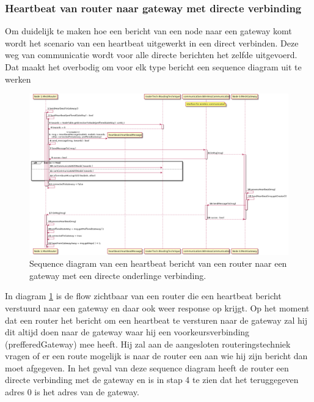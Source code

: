 \documentclass[a4paper, 11pt, oneside]{report}
\begin{document}
\subsubsection{Heartbeat van router naar gateway met directe verbinding}
\label{DetailedDesign:Communicatie:sequence:heartbeatrouter->gateway}
Om duidelijk te maken hoe een bericht van een node naar een gateway komt wordt het scenario van een heartbeat uitgewerkt in een direct verbinden.
Deze weg van communicatie wordt voor alle directe berichten het zelfde uitgevoerd.
Dat maakt het overbodig om voor elk type bericht een sequence diagram uit te werken
\begin{figure}[H]
	\begin{center}\includegraphics[width=.97\linewidth]{UML/out/Communication/Sequence/RouterDirectNaarGatewayHeartbeat/RouterDirectNaarGatewayHeartbeat.png}\end{center}
	\caption{Sequence diagram van een heartbeat bericht van een router naar een gateway met een directe onderlinge verbinding.}
	\label{fig:communication:sequence:sequence:heartbeatrouter->gateway}
\end{figure}
In diagram \ref{fig:communication:sequence:sequence:heartbeatrouter->gateway} is de flow zichtbaar van een router die een heartbeat bericht verstuurd naar een gateway en daar ook weer response op krijgt.
Op het moment dat een router het bericht om een heartbeat te versturen naar de gateway zal hij dit altijd doen naar de gateway waar hij een voorkeursverbinding (prefferedGateway) mee heeft.
Hij zal aan de aangesloten routeringstechniek vragen of er een route mogelijk is naar de router een aan wie hij zijn bericht dan moet afgegeven.
In het geval van deze sequence diagram heeft de router een directe verbinding met de gateway en is in stap 4 te zien dat het teruggegeven adres 0 is het adres van de gateway.
\end{document}
